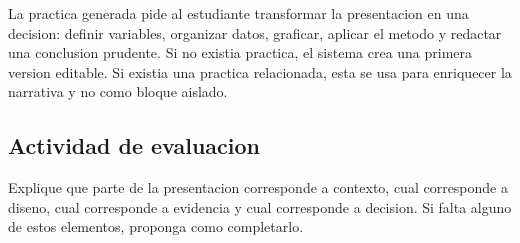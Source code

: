 La practica generada pide al estudiante transformar la presentacion en una decision: definir variables, organizar datos, graficar, aplicar el metodo y redactar una conclusion prudente. Si no existia practica, el sistema crea una primera version editable. Si existia una practica relacionada, esta se usa para enriquecer la narrativa y no como bloque aislado.

\subsection{Actividad de evaluacion}

Explique que parte de la presentacion corresponde a contexto, cual corresponde a diseno, cual corresponde a evidencia y cual corresponde a decision. Si falta alguno de estos elementos, proponga como completarlo.
